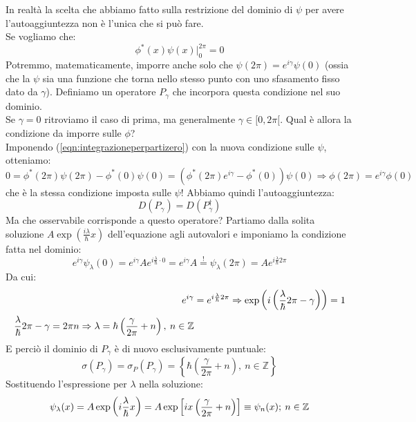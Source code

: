 \documentclass[../../FisicaTeorica.tex]{subfiles}
\begin{document}
In realtà la scelta che abbiamo fatto sulla restrizione del dominio di $\psi$ per avere l'autoaggiuntezza non è l'unica che si può fare.\\
Se vogliamo che:
\begin{equation}
\phi^\ast\left(x\right)\psi \left(x\right)\big|_0^{2\pi}=0
\label{eqn:integrazioneperpartizero}
\end{equation}
Potremmo, matematicamente, imporre anche solo che $\psi \left(2\pi\right)=e^{i\gamma}\psi \left(0\right)$ (ossia che la $\psi$ sia una funzione  che torna nello stesso punto con uno sfasamento fisso dato da $\gamma$). Definiamo un operatore $P_\gamma$ che incorpora questa condizione nel suo dominio.\\
Se $\gamma =0$ ritroviamo il caso di prima, ma generalmente $\gamma \in [0, 2\pi [$. Qual è allora la condizione da imporre sulle $\phi$?\\
Imponendo (\ref{eqn:integrazioneperpartizero}) con la nuova condizione sulle $\psi$, otteniamo:
\[
0= \phi^\ast\left(2\pi\right)\psi\left(2\pi\right)- \phi^\ast\left(0\right)\psi \left(0\right)=\left(\phi^\ast\left(2\pi\right)e^{i\gamma}-\phi^\ast\left(0\right)\right)\psi\left(0\right)\Rightarrow \phi\left(2\pi\right)=e^{i\gamma}\phi \left(0\right)
\]
che è la stessa condizione imposta sulle $\psi$! Abbiamo quindi l'autoaggiuntezza:
\[
D\left(P_\gamma\right)=D\left(P_\gamma^\dag\right)
\]
Ma che osservabile corrisponde a questo operatore? Partiamo dalla solita soluzione $A\exp\left(\frac{i\lambda}{\hbar}x\right)$ dell'equazione agli autovalori e imponiamo la condizione fatta nel dominio:
\[
e^{i\gamma}\psi_\lambda\left(0\right)=e^{i\gamma}A e^{i\frac{\lambda}{\hbar}\cdot 0}=e^{i\gamma}A\overset{!}{=}\psi_\lambda\left(2\pi\right)=A e^{i\frac{\lambda}{\hbar}2\pi}
\]
Da cui: 
\begin{align}
e^{i\gamma}&=e^{i\frac{\lambda}{\hbar}2\pi}\Rightarrow \exp\left(i\left(\frac{\lambda}{\hbar}2\pi -\gamma\right)\right) = 1\\
\frac{\lambda}{\hbar}2\pi -\gamma = 2\pi n \Rightarrow 
\lambda = \hbar \left(\frac{\gamma}{2\pi} + n\right), \> n\in \mathbb{Z}
\end{align}
E perciò il dominio di $P_\gamma$ è di nuovo esclusivamente puntuale:
\[
\sigma\left(P_\gamma\right)= \sigma_P\left(P_\gamma\right)= \left\{\hbar\left(\frac{\gamma}{2\pi}+n\right),\ n\in\mathbb{Z}\right\}
\]
Sostituendo l'espressione per $\lambda$ nella soluzione:
\[
\psi_\lambda(x) = A \exp\left(i\frac{\lambda}{\hbar}x\right) = A \exp\left [ix\left(\frac{\gamma}{2\pi}+n\right)\right ] \equiv \psi_n(x); \> n\in\mathbb{Z}
\]
\end{document}
